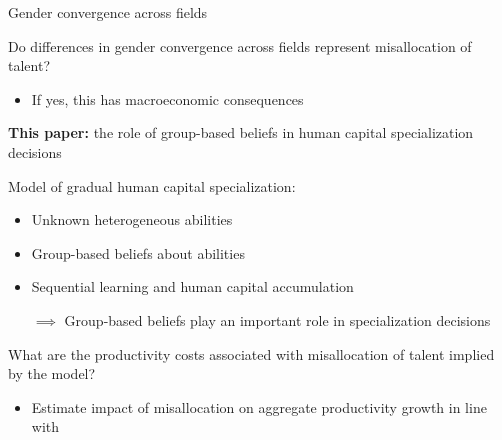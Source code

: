 \documentclass[compress, 8pt]{beamer}
\begin{document}
\begin{frame}{Gender convergence across fields}

Do differences in gender convergence across fields represent misallocation of talent?
\begin{itemize}
    \item If yes, this has macroeconomic consequences 
    

\end{itemize}


\pause
\vspace{3ex} 
\textbf{This paper:} the role of group-based beliefs in human capital specialization decisions

\vspace{3ex}
Model of gradual human capital specialization:
\begin{itemize}
    \item Unknown heterogeneous abilities 
    \item Group-based beliefs about abilities 
    \item Sequential learning and human capital accumulation
    \item [$\implies$] Group-based beliefs play an important role in specialization decisions
\end{itemize}

\vspace{3ex}
What are the productivity costs associated with misallocation of talent implied by the model? 
\begin{itemize}
    \item Estimate impact of misallocation on aggregate productivity growth in line with  
\end{itemize}

\end{frame}
\end{document}
